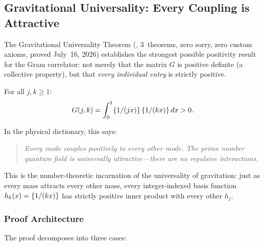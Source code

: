 \subsection{Gravitational Universality: Every Coupling is Attractive}
\label{sec:gravitational-universality}

The Gravitational Universality Theorem
(, 3~theorems, zero sorry,
zero custom axioms, proved July~16, 2026) establishes the strongest
possible positivity result for the Gram correlator: not merely that the
matrix $G$ is positive definite (a collective property), but that
\emph{every individual entry} is strictly positive.

\begin{theorem}
\label{thm:gravitational-universality}
For all $j, k \geq 1$:
\[
  G(j,k) = \int_0^1 \{1/(jx)\}\,\{1/(kx)\}\,dx > 0.
\]
\end{theorem}

In the physical dictionary, this says:
\begin{quote}
\emph{Every mode couples positively to every other mode.
The prime number quantum field is universally attractive---there
are no repulsive interactions.}
\end{quote}

This is the number-theoretic incarnation of the universality of
gravitation: just as every mass attracts every other mass, every
integer-indexed basis function $h_k(x) = \{1/(kx)\}$ has
strictly positive inner product with every other $h_j$.

\subsubsection{Proof Architecture}

The proof decomposes into three cases:

